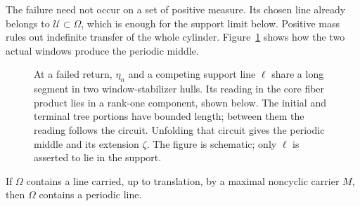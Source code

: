 The failure need not occur on a set of positive measure. Its chosen
line already belongs to $\mathcal U\subset\Omega$, which is enough
for the support limit below. Positive mass rules out indefinite
transfer of the whole cylinder. Figure~\ref{exp:failure-figure}
shows how the two actual windows produce the periodic middle.

\begin{figure}[ht]
\centering
{}
\caption{At a failed return, $\eta_n$ and a competing support line
$\ell$ share a long segment in two window-stabilizer hulls. Its reading
in the core fiber product lies in a rank-one component, shown below.
The initial and terminal tree portions have bounded length; between
them the reading follows the circuit. Unfolding that circuit gives the
periodic middle and its extension $\zeta$. The figure is schematic;
only $\ell$ is asserted to lie in the support.}
\label{exp:failure-figure}
\end{figure}

\begin{proposition}
\label{exp:carrier-periodic}
If $\Omega$ contains a line carried, up to translation, by a maximal
noncyclic carrier $M$, then $\Omega$ contains a periodic line.
\end{proposition}

